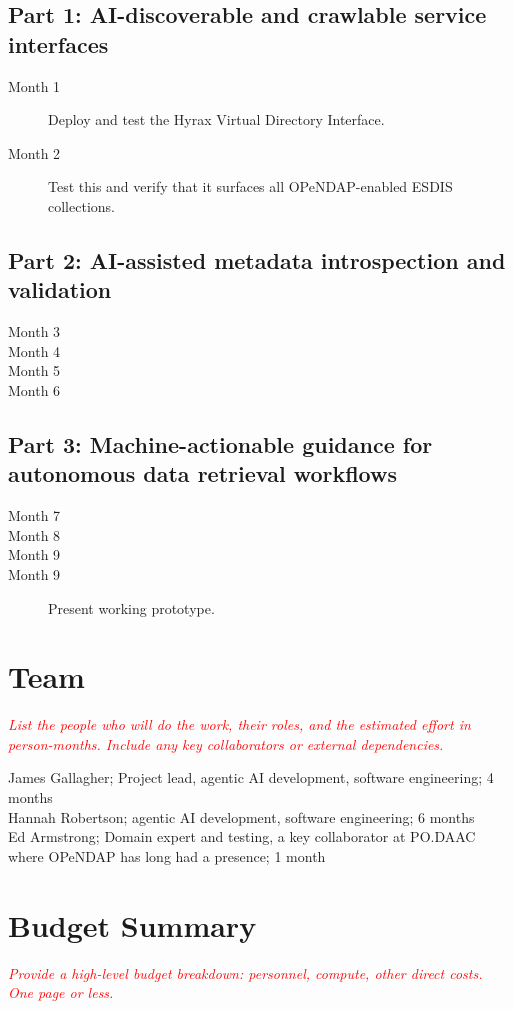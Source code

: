 \documentclass[11pt]{article}
\begin{document}
\subsection*{Part 1: AI-discoverable and crawlable service interfaces} 
\begin{description}
    \item [Month 1] Deploy and test the Hyrax Virtual Directory Interface.
    \item [Month 2] Test this and verify that it surfaces all \ac{OPeNDAP}-enabled \ac{ESDIS} collections. 
\end{description}

\subsection*{Part 2: AI-assisted metadata introspection and validation} 
\begin{description}
    \item [Month 3] 
    \item [Month 4] 
    \item [Month 5] 
    \item [Month 6]
    \end{description}

\subsection*{Part 3: Machine-actionable guidance for autonomous data retrieval workflows} 
\begin{description}
    \item [Month 7] 
    \item [Month 8] 
    \item [Month 9] 
    \item [Month 9] Present working prototype. 
\end{description}

\section{Team}
\textcolor{red}{\textit{List the people who will do the work, their roles, and the estimated effort in person-months. Include any key collaborators or external dependencies.}}

\begin{flushleft}
\noindent James Gallagher; Project lead, agentic \ac{AI} development, software engineering; 4 months\\
Hannah Robertson; agentic \ac{AI} development, software engineering; 6 months\\
Ed Armstrong; Domain expert and testing, a key collaborator at \ac{PO.DAAC} where \ac{OPeNDAP} has long had a presence; 1 month\\
\end{flushleft}

\section{Budget Summary}
\textcolor{red}{\textit{Provide a high-level budget breakdown: personnel, compute, other direct costs. One page or less.}}



\end{document}
